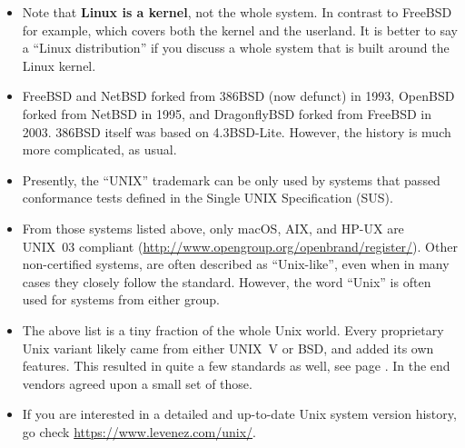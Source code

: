 \documentclass[article]{seminar}
\newcommand{\sltitle}[1]{{\centering\textbf{\Large #1}
    \vskip 2em plus 0pt minus 2em\par}} %
\newcommand{\emsl}[1]{\textbf{#1}} %
\begin{document}





\begin{itemize}
\item Note that \emsl{Linux is a kernel}, not the whole system.  In contrast to
FreeBSD for example, which covers both the kernel and the userland.  It is
better to say a ``Linux distribution'' if you discuss a whole system that is
built around the Linux kernel.
\item FreeBSD and NetBSD forked from 386BSD (now defunct) in 1993, OpenBSD
forked from NetBSD in 1995, and DragonflyBSD forked from FreeBSD in 2003.
386BSD itself was based on 4.3BSD-Lite.  However, the history is much more
complicated, as usual.
\item Presently, the ``UNIX'' trademark can be only used by systems that passed
conformance tests defined in the Single UNIX Specification (SUS).
\item From those systems listed above, only macOS, AIX, and HP-UX are
UNIX~03 compliant (\url{http://www.opengroup.org/openbrand/register/}).  Other
non-certified systems, are often described as ``Unix-like'', even when in many
cases they closely follow the standard.  However, the word ``Unix'' is often used
for systems from either group.
\item The above list is a tiny fraction of the whole Unix world.  Every
proprietary Unix variant likely came from either UNIX~V or BSD, and added its
own features.  This resulted in quite a few standards as well, see page
\pageref{UNIXSTANDARDS}.  In the end vendors agreed upon a small set of those.
\item If you are interested in a detailed and up-to-date Unix system version
history, go check \url{https://www.levenez.com/unix/}.
\end{itemize}


\end{document}
